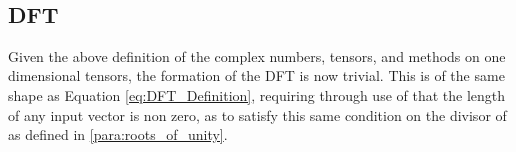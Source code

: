 \begin{code}%
%
\>[2]\AgdaSpace{}%
\AgdaSymbol{:}\AgdaSpace{}%
\AgdaSpace{}%
\AgdaSymbol{(}\AgdaSpace{}%
\AgdaSymbol{)}\AgdaSpace{}%
\<%
\\
%
\>[2]\AgdaSpace{}%
\AgdaSymbol{(}\AgdaSpace{}%
\AgdaSymbol{)}\AgdaSpace{}%
\AgdaSymbol{=}\AgdaSpace{}%
\AgdaSpace{}%
\<%
\end{code}

\subsection{DFT}
Given the above definition of the complex numbers, tensors, and methods on one 
dimensional tensors, the formation of the DFT is now trivial.
This is of the same shape as Equation \ref{eq:DFT_Definition}, requiring through 
use of  that the length of any input vector is non zero, as to satisfy 
this same condition on the divisor of  as defined in \ref{para:roots_of_unity}.

\begin{code}%
%
\>[2]\AgdaSpace{}%
\AgdaSymbol{:}\AgdaSpace{}%
\AgdaSpace{}%
\AgdaSymbol{(}\AgdaSpace{}%
\AgdaSymbol{)}\AgdaSpace{}%
\AgdaSpace{}%
\AgdaSpace{}%
\AgdaSpace{}%
\AgdaSymbol{(}\AgdaSpace{}%
\AgdaSymbol{)}\AgdaSpace{}%
\<%
\\
%
\>[2]\AgdaSpace{}%
\AgdaSymbol{\{}\AgdaSymbol{\}}\AgdaSpace{}%
\AgdaSpace{}%
\AgdaSpace{}%
\AgdaSymbol{=}\AgdaSpace{}%
\AgdaSpace{}%
\AgdaSpace{}%
\AgdaSpace{}%
\AgdaSpace{}%
\AgdaSpace{}%
\AgdaSpace{}%
\AgdaOperator{\AgdaField{*}}\AgdaSpace{}%
\AgdaSpace{}%
\AgdaSpace{}%
\AgdaSymbol{(}\AgdaSpace{}%
\AgdaSpace{}%
\AgdaSpace{}%
\AgdaSpace{}%
\AgdaSymbol{)}\<%
\end{code}
\begin{code}[hide]%
\>[2][@{}l@{\AgdaIndent{1}}]%
\>[4]\<%
\\
\>[4][@{}l@{\AgdaIndent{0}}]%
\>[6]\<%
\\
\>[6][@{}l@{\AgdaIndent{0}}]%
\>[8]\<%
\\
\>[8][@{}l@{\AgdaIndent{0}}]%
\>[10]\AgdaPostulate{\AgdaUnderscore{}}\AgdaSpace{}%
\AgdaSymbol{:}\AgdaSpace{}%
\AgdaSpace{}%
\<%
\end{code}


